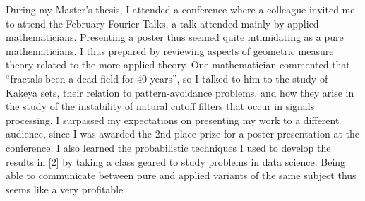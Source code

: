 \documentclass[12pt]{article}
\theoremstyle{plain}
\theoremstyle{remark}
\theoremstyle{definition}
\begin{document}
During my Master's thesis, I attended a conference where a colleague invited me to attend the February Fourier Talks, a talk attended mainly by applied mathematicians. Presenting a poster thus seemed quite intimidating as a pure mathematicians. %
I thus prepared by reviewing aspects of geometric measure theory related to the more applied theory. One mathematician commented that ``fractals been a dead field for 40 years'', so I talked to him to the study of Kakeya sets, their relation to pattern-avoidance problems, and how they arise in the study of the instability of natural cutoff filters that occur in signals processing. I surpassed my expectations on presenting my work to a different audience, since I was awarded the 2nd place prize for a poster presentation at the conference. I also learned the probabilistic techniques I used to develop the results in [2] by taking a class geared to study problems in data science. Being able to communicate between pure and applied variants of the same subject thus seems like a very profitable 
\end{document}
